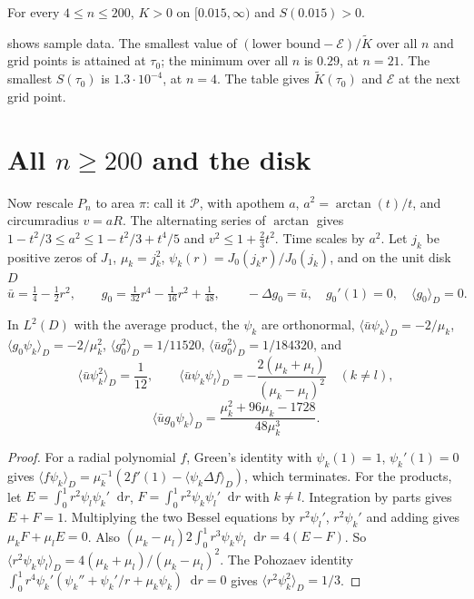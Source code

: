 \documentclass[11pt,a4paper]{report}
\DeclareRobustCommand*{\avg}[1]{\langle #1\rangle}
\DeclareRobustCommand*{\dd}{\mathop{}\!\mathrm{d}}
\DeclareRobustCommand*{\Pg}{P_n}
\begin{document}
\begin{proposition}\label{prop:finite}
For every \(4\le n\le200\), \(K>0\) on \([0.015,\infty)\) and \(S(0.015)>0\).
\end{proposition}

 shows sample data. The smallest value of \((\text{lower bound}-\mathcal E)/\tilde K\) over all \(n\) and grid points is
attained at \(\tau_0\); the minimum over all \(n\) is \(0.29\), at \(n=21\). The smallest \(S(\tau_0)\) is \(1.3\cdot10^{-4}\), at \(n=4\). The table gives \(\tilde K(\tau_0)\) and \(\mathcal E\) at the next grid point.

\begin{table}
\centering
\footnotesize
\setlength{\tabcolsep}{4pt}

\caption{Certificates of , sample of \(n\). All numbers are rounded to the digits shown, \(\tau_0=0.015\).
Full data: \texttt{certificates/finite\_4\_200.json}.}
\label{tab:finite}
\end{table}

\section{All \texorpdfstring{\(n\ge200\)}{n >= 200} and the disk}\label{sec:large}

Now rescale \(\Pg\) to area \(\pi\): call it \(\mathcal P\), with apothem \(a\), \(a^2=\arctan(t)/t\), and circumradius \(v=aR\). The alternating
series of \(\arctan\) gives \(1-t^2/3\le a^2\le1-t^2/3+t^4/5\) and \(v^2\le1+\frac23t^2\). Time scales by \(a^2\). Let \(j_k\) be positive zeros of \(J_1\),
\(\mu_k=j_k^2\), \(\psi_k(r)=J_0(j_kr)/J_0(j_k)\), and on the unit disk \(D\)
\[
\bar u=\tfrac14-\tfrac12r^2,\qquad g_0=\tfrac1{32}r^4-\tfrac1{16}r^2+\tfrac1{48},\qquad -\Delta g_0=\bar u,\quad g_0'(1)=0,\quad\avg{g_0}_D=0.
\]
\begin{lemma}[note=disk data]\label{lem:disk}
In \(L^2(D)\) with the average product, the \(\psi_k\) are orthonormal, \(\avg{\bar u\psi_k}_D=-2/\mu_k\), \(\avg{g_0\psi_k}_D=-2/\mu_k^2\),
\(\avg{g_0^2}_D=1/11520\), \(\avg{\bar ug_0^2}_D=1/184320\), and
\[
\avg{\bar u\psi_k^2}_D=\frac1{12},\qquad\avg{\bar u\psi_k\psi_l}_D=-\frac{2(\mu_k+\mu_l)}{(\mu_k-\mu_l)^2}\quad(k\ne l),
\]
\[
\avg{\bar ug_0\psi_k}_D=\frac{\mu_k^2+96\mu_k-1728}{48\mu_k^3}.
\]
\end{lemma}
\begin{proof}
For a radial polynomial \(f\), Green's identity with \(\psi_k(1)=1\), \(\psi_k'(1)=0\) gives \(\avg{f\psi_k}_D=\mu_k^{-1}(2f'(1)-\avg{\psi_k\Delta f}_D)\),
which terminates. For the products, let \(E=\int_0^1r^2\psi_l\psi_k'\dd r\), \(F=\int_0^1r^2\psi_k\psi_l'\dd r\) with \(k\ne l\). Integration by parts gives \(E+F=1\). Multiplying
the two Bessel equations by \(r^2\psi_l'\), \(r^2\psi_k'\) and adding gives \(\mu_kF+\mu_lE=0\). Also \((\mu_k-\mu_l)2\int_0^1r^3\psi_k\psi_l\dd r=4(E-F)\). So
\(\avg{r^2\psi_k\psi_l}_D=4(\mu_k+\mu_l)/(\mu_k-\mu_l)^2\). The Pohozaev identity \(\int_0^1r^4\psi_k'(\psi_k''+\psi_k'/r+\mu_k\psi_k)\dd r=0\) gives
\(\avg{r^2\psi_k^2}_D=1/3\).
\end{proof}
\end{document}
